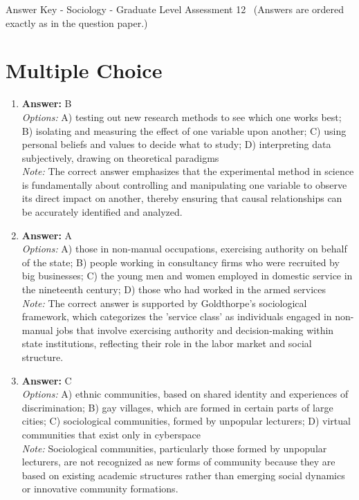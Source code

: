 \documentclass[12pt]{article}
\begin{document}
\begin{center}
Answer Key - Sociology - Graduate Level Assessment 12 \
\small (Answers are ordered exactly as in the question paper.)
\end{center}

\section*{Multiple Choice}
\begin{enumerate}[label=\arabic*.]
\item \textbf{Answer:} B
\\ \textit{Options:} A) testing out new research methods to see which one works best; B) isolating and measuring the effect of one variable upon another; C) using personal beliefs and values to decide what to study; D) interpreting data subjectively, drawing on theoretical paradigms
\\ \textit{Note:} The correct answer emphasizes that the experimental method in science is fundamentally about controlling and manipulating one variable to observe its direct impact on another, thereby ensuring that causal relationships can be accurately identified and analyzed.
\item \textbf{Answer:} A
\\ \textit{Options:} A) those in non-manual occupations, exercising authority on behalf of the state; B) people working in consultancy firms who were recruited by big businesses; C) the young men and women employed in domestic service in the nineteenth century; D) those who had worked in the armed services
\\ \textit{Note:} The correct answer is supported by Goldthorpe's sociological framework, which categorizes the 'service class' as individuals engaged in non-manual jobs that involve exercising authority and decision-making within state institutions, reflecting their role in the labor market and social structure.
\item \textbf{Answer:} C
\\ \textit{Options:} A) ethnic communities, based on shared identity and experiences of discrimination; B) gay villages, which are formed in certain parts of large cities; C) sociological communities, formed by unpopular lecturers; D) virtual communities that exist only in cyberspace
\\ \textit{Note:} Sociological communities, particularly those formed by unpopular lecturers, are not recognized as new forms of community because they are based on existing academic structures rather than emerging social dynamics or innovative community formations.

\end{enumerate}
\end{document}
